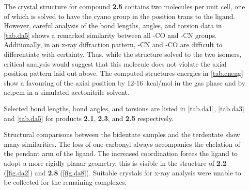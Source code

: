 

The crystal structure for compound \textbf{2.5} contains two molecules per unit cell, one of which is solved to have the cyano group in the position trans to the ligand. However, careful analysis of the bond lengths, angles, and torsion data in \autoref{tab.da5} shows a remarked similarity between all -CO and -CN groups. Additionally, in an x-ray diffraction pattern, -CN and -CO are difficult to differentiate with certainty. Thus, while the structure solved to the two isomers, critical analysis would suggest that this molecule does not violate the axial position pattern laid out above. The computed structures energies in \autoref{tab.cneng} show a favouring of the axial position by 12-16~kcal/mol in the gas phase and by \gls{ac.pcm} in a simulated acetonitrile solvent. 

Selected bond lengths, bond angles, and torsions are listed in \autoref{tab.da1}, \autoref{tab.da3} and \autoref{tab.da5} for products \textbf{2.1}, \textbf{2.3}, and \textbf{2.5} respectively.





\FloatBarrier

Structural comparisons between the bidentate samples and the terdentate show many similarities. The loss of one carbonyl always accompanies the chelation of the pendant arm of the ligand. The increased coordination forces the ligand to adopt a more rigidly planar geometry, this is visible in the structure of \textbf{2.2} (\autoref{fig.da2}) and \textbf{2.8} (\autoref{fig.da8}). Suitable crystals for x-ray analysis were unable to be collected for the remaining complexes.

